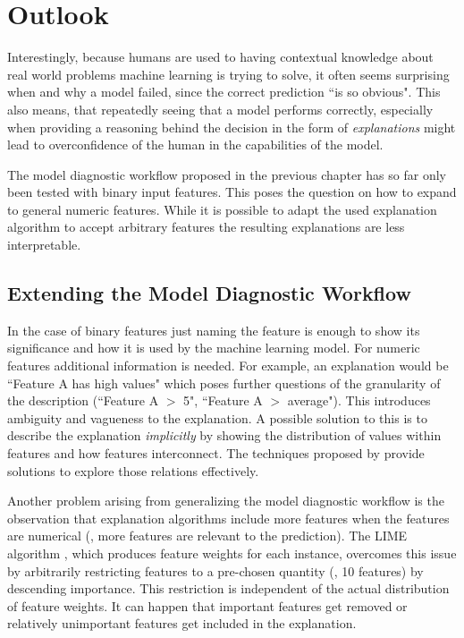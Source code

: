 \chapter{Outlook}
\label{chap:current}

Interestingly, because humans are used to having contextual knowledge about real world problems machine learning is trying to solve, it often seems surprising when and why a model failed, since the correct prediction ``is so obvious".
This also means, that repeatedly seeing that a model performs correctly, especially when providing a reasoning behind the decision in the form of \emph{explanations} might lead to overconfidence of the human in the capabilities of the model.

The model diagnostic workflow proposed in the previous chapter has so far only been tested with binary input features.
This poses the question on how to expand to general numeric features.
While it is possible to adapt the used explanation algorithm to accept arbitrary features the resulting explanations are less interpretable.




\section{Extending the Model Diagnostic Workflow}
In the case of binary features just naming the feature is enough to show its significance and how it is used by the machine learning model.
For numeric features additional information is needed.
For example, an explanation would be ``Feature A has high values" which poses further questions of the granularity of the description (``Feature A $>$ 5", ``Feature A $>$ average").
This introduces ambiguity and vagueness to the explanation.
A possible solution to this is to describe the explanation \emph{implicitly} by showing the distribution of values within features and how features interconnect.
The techniques proposed by \cite{seekaview} provide solutions to explore those relations effectively.

Another problem arising from generalizing the model diagnostic workflow is the observation that explanation algorithms include more features when the features are numerical (\ie, more features are relevant to the prediction).
The LIME algorithm \cite{DBLP:journals/corr/RibeiroSG16}, which produces feature weights for each instance, overcomes this issue by arbitrarily restricting features to a pre-chosen quantity (\eg, 10 features) by descending importance.
This restriction is independent of the actual distribution of feature weights.
It can happen that important features get removed or relatively unimportant features get included in the explanation.

